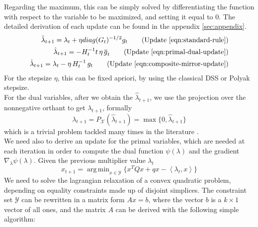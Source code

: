 \documentclass[notitlepage]{article}
\DeclareMathOperator*{\argmin}{arg\,min}
\begin{document}
Regarding the maximum, this can be simply solved by differentiating the function with respect to the variable to be maximized, and setting it equal to $0$. The detailed derivation of each update can be found in the appendix \ref{sec:appendix}.
\begin{subequations}
  \label{eqn:minimized}
  \begin{align}
    \hat{\lambda}_{t+1} = \lambda_t + \eta diag(G_t)^{-1/2} g_t 
    \tag{Update \eqref{eqn:standard-rule}} \\
    \hat{\lambda}_{t+1} = -H_t^{-1} t\, \eta\, \overline{g}_t
    \tag{Update \eqref{eqn:primal-dual-update}} \\
    \hat{\lambda}_{t+1} = \lambda_t - \eta\, H_t^{-1}\, g_t 
    \tag{Update \eqref{eqn:composite-mirror-update}}
  \end{align}
\end{subequations}
For the stepsize $\eta$, this can be fixed apriori, by using the classical DSS or Polyak stepsize.\\
For the dual variables, after we obtain the $\hat{\lambda}_{t+1}$, we use the projection over the nonnegative orthant to get $\lambda_{t+1}$, formally
\[
  \lambda_{t+1} = P_\mathcal{X}(\hat{\lambda}_{t+1}) = \max{ \{ 0,\hat{\lambda}_{t+1} \} }
\]
which is a trivial problem tackled many times in the literature \cite{nonnegative-orthant}.\\
We need also to derive an update for the primal variables, which are needed at each iteration in order to compute the dual function $\psi( \lambda )$ and the gradient $\nabla_\lambda \psi( \lambda )$. Given the previous multiplier value $\lambda_t$
\[
  x_{t+1} = \argmin_{x \in \mathcal{Y}} \{ x^T Q x + q x - \left\langle \lambda_t,x \right\rangle \}
\]
We need to solve the lagrangian relaxation of a convex quadratic problem, depending on equality constraints made up of disjoint simplices. The constraint set $\mathcal{Y}$ can be rewritten in a matrix form $Ax = b$, where the vector $b$ is a $k \times 1$ vector of all ones, and the matrix $A$
can be derived with the following simple algorithm:
\end{document}
